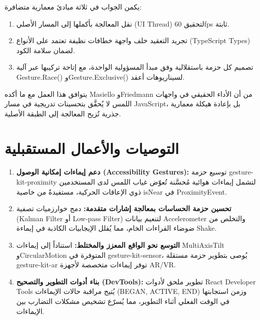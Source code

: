 \begin{Arabic}
يكمن الجواب في ثلاثة مبادئ معمارية متضافرة:
\begin{enumerate}
    \item نقل المعالجة بأكملها إلى المسار الأصلي (\textenglish{UI Thread}) لتحقيق 60fps ثابتة.
    \item تجريد التعقيد خلف واجهة خطافات نظيفة تعتمد على الأنواع (\textenglish{TypeScript Types}) لضمان سلامة الكود.
    \item تصميم كل حزمة باستقلالية وفق مبدأ المسؤولية الواحدة، مع إتاحة تركيبها عبر آلية \textenglish{Gesture.Race()} و\textenglish{Gesture.Exclusive()} لسيناريوهات أعقد.
\end{enumerate}

يتوافق هذا العمل مع ما أكده \textenglish{Masiello} و\textenglish{Friedmann} \cite{masiello2017} من أن الأداء الحقيقي في واجهات اللمس لا يُحقَّق بتحسينات تدريجية في مسار \textenglish{JavaScript}، بل بإعادة هيكلة معمارية جذرية تُزيح المعالجة إلى الطبقة الأصلية.

\section{التوصيات والأعمال المستقبلية}

\begin{enumerate}
    \item \textbf{دعم إيماءات إمكانية الوصول (\textenglish{Accessibility Gestures}):} توسيع حزمة \textenglish{gesture-kit-proximity} لتشمل إيماءات هوائية مُحسَّنة تُعوّض غياب اللمس لدى المستخدمين ذوي الإعاقات الحركية، مستفيدةً من خاصية \textenglish{isNear} في \textenglish{ProximityEvent}.

    \item \textbf{تحسين حزمة الحساسات بمعالجة إشارات متقدمة:} دمج خوارزميات تصفية (\textenglish{Kalman Filter} أو \textenglish{Low-pass Filter}) لتنعيم بيانات \textenglish{Accelerometer} والتخلص من ضوضاء القراءات الخام، مما يُقلل الإيجابيات الكاذبة في إيماءة \textenglish{Shake}.

    \item \textbf{التوسع نحو الواقع المعزز والمختلط:} استناداً إلى إيماءات \textenglish{MultiAxisTilt} و\textenglish{CircularMotion} المتوفرة في \textenglish{gesture-kit-sensor}، يُوصى بتطوير حزمة مستقلة \textenglish{gesture-kit-ar} توفر إيماءات متخصصة لأجهزة \textenglish{AR/VR}.

    \item \textbf{بناء أدوات التطوير والتصحيح (\textenglish{DevTools}):} تطوير ملحق لأدوات \textenglish{React Developer Tools} يُتيح مراقبة حالات الإيماءات (\textenglish{BEGAN, ACTIVE, END}) وزمن استجابتها في الوقت الفعلي أثناء التطوير، مما يُسرّع تشخيص مشكلات التضارب بين الإيماءات.


\end{enumerate}
\end{Arabic}
